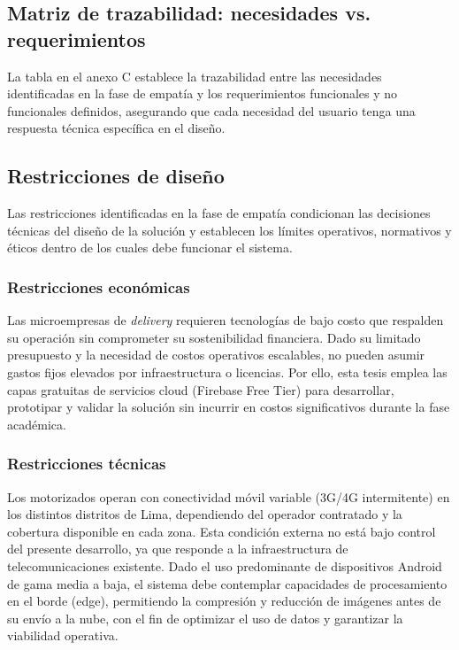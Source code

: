 \subsection{Matriz de trazabilidad: necesidades vs. requerimientos}

La tabla en el anexo C establece la trazabilidad entre las necesidades identificadas en la fase de empatía y los requerimientos funcionales y no funcionales definidos, asegurando que cada necesidad del usuario tenga una respuesta técnica específica en el diseño.

\subsection{Restricciones de diseño}

Las restricciones identificadas en la fase de empatía condicionan las decisiones técnicas del diseño de la solución y establecen los límites operativos, normativos y éticos dentro de los cuales debe funcionar el sistema.

\subsubsection{Restricciones económicas}

Las microempresas de \textit{delivery} requieren tecnologías de bajo costo que respalden su operación sin comprometer su sostenibilidad financiera. Dado su limitado presupuesto y la necesidad de costos operativos escalables, no pueden asumir gastos fijos elevados por infraestructura o licencias. Por ello, esta tesis emplea las capas gratuitas de servicios cloud (Firebase Free Tier) para desarrollar, prototipar y validar la solución sin incurrir en costos significativos durante la fase académica.

\subsubsection{Restricciones técnicas}

Los motorizados operan con conectividad móvil variable (3G/4G intermitente) en los distintos distritos de Lima, dependiendo del operador contratado y la cobertura disponible en cada zona. Esta condición externa no está bajo control del presente desarrollo, ya que responde a la infraestructura de telecomunicaciones existente. Dado el uso predominante de dispositivos Android de gama media a baja, el sistema debe contemplar capacidades de procesamiento en el borde (edge), permitiendo la compresión y reducción de imágenes antes de su envío a la nube, con el fin de optimizar el uso de datos y garantizar la viabilidad operativa.


